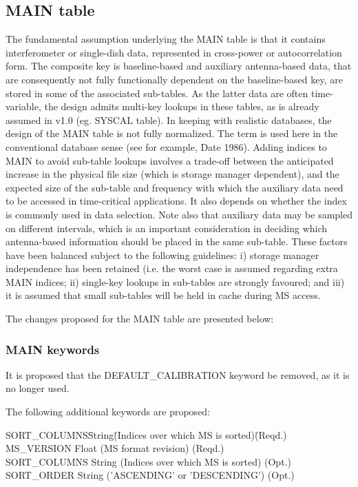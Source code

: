 \documentclass{article}
\begin{document}
\subsection{MAIN table}

The fundamental assumption underlying the MAIN table is that it
contains interferometer or single-dish data, represented in
cross-power or autocorrelation form. The composite key is
baseline-based and auxiliary antenna-based data, that are consequently
not fully functionally dependent on the baseline-based key, are stored
in some of the associated sub-tables. As the latter data are often
time-variable, the design admits multi-key lookups in these tables, as
is already assumed in v1.0 (eg. SYSCAL table). In keeping with
realistic databases, the design of the MAIN table is not fully
normalized. The term is used here in the conventional database sense
(see for example, Date 1986). Adding indices to MAIN to avoid
sub-table lookups involves a trade-off between the anticipated
increase in the physical file size (which is storage manager
dependent), and the expected size of the sub-table and frequency with
which the auxiliary data need to be accessed in time-critical
applications. It also depends on whether the index is commonly used in
data selection. Note also that auxiliary data may be sampled on
different intervals, which is an important consideration in deciding
which antenna-based information should be placed in the same
sub-table. These factors have been balanced subject to the following
guidelines: i) storage manager independence has been retained
(i.e. the worst case is assumed regarding extra MAIN indices; ii)
single-key lookups in sub-tables are strongly favoured; and iii) it is
assumed that small sub-tables will be held in cache during MS access.

The changes proposed for the MAIN table are presented below:

\subsubsection{MAIN keywords}

It is proposed that the DEFAULT\_CALIBRATION keyword be removed, as it
is no longer used. 

The following additional keywords are proposed:

\begin{tabbing}
SORT\_COLUMNS\quad\quad  \= String\quad\quad  \=
(Indices over which MS is sorted)\quad\quad \= (Reqd.) \kill
MS\_VERSION \> Float \> (MS format revision) \> (Reqd.) \\
SORT\_COLUMNS  \> String  \> (Indices over which MS is sorted) \> (Opt.) \\
SORT\_ORDER \> String \> ('ASCENDING' or 'DESCENDING') \> (Opt.) \\
\end{tabbing}
\end{document}
